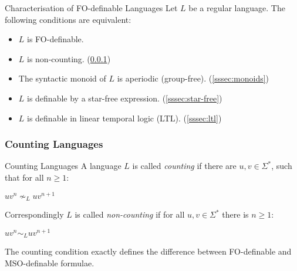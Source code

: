 \documentclass[english]{panikzettel}
\begin{document}
\begin{theo}{Characterisation of FO-definable Languages}
Let $L$ be a regular language. The following conditions are equivalent:
\begin{itemize}
    \item $L$ is FO-definable.
    \item $L$ is non-counting. (\ref{sssec:counting})
    \item The syntactic monoid of $L$ is aperiodic (group-free). (\ref{sssec:monoids})
    \item $L$ is definable by a star-free expression. (\ref{sssec:star-free})
    \item $L$ is definable in linear temporal logic (LTL). (\ref{sssec:ltl})
\end{itemize}
\end{theo}

\subsubsection{Counting Languages}
\label{sssec:counting}
\begin{defi}{Counting Languages}
    A language $L$ is called \emph{counting} if there are $u,v \in \Sigma^*$, such that for all $n \geq 1$:
    \begin{tightcenter}
        $uv^n \nsim_L uv^{n+1}$
    \end{tightcenter}

    Correspondingly $L$ is called \emph{non-counting} if for all $u,v \in \Sigma^*$ there is $n \geq 1$:
    \begin{tightcenter}
        $uv^n \sim_L uv^{n+1}$
    \end{tightcenter}
\end{defi}

The counting condition exactly defines the difference between FO-definable and MSO-definable formulae.
\end{document}
